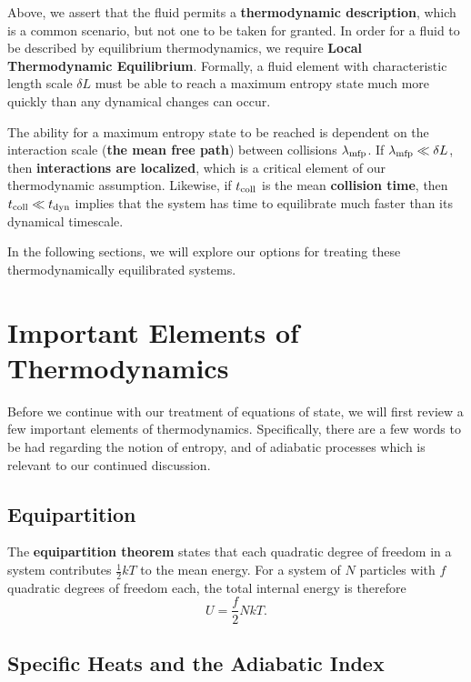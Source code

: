 \begin{remark}
    Above, we assert that the fluid permits a \textbf{thermodynamic description}, which is a common scenario, but not one to be taken for granted. In order for a fluid to be described by equilibrium thermodynamics, we require \textbf{Local Thermodynamic Equilibrium}. Formally, a fluid element with characteristic length scale $\delta L$ must be able to reach a maximum entropy state much more quickly than any dynamical changes can occur.

The ability for a maximum entropy state to be reached is dependent on the interaction scale (\textbf{the mean free path}) between collisions $\lambda_{\rm mfp}$. If $\lambda_{\rm mfp} \ll \delta L$, then \textbf{interactions are localized}, which is a critical element of our thermodynamic assumption. Likewise, if $t_{\rm coll}$ is the mean \textbf{collision time}, then $t_{\rm coll} \ll t_{\rm dyn}$ implies that the system has time to equilibrate much faster than its dynamical timescale.
\end{remark}

In the following sections, we will explore our options for treating these thermodynamically equilibrated systems.

\section{Important Elements of Thermodynamics}

Before we continue with our treatment of equations of state, we will first review a few important elements of thermodynamics. Specifically, there are a few words to be had regarding
the notion of entropy, and of adiabatic processes which is relevant to our continued discussion.

\subsection{Equipartition}

The \textbf{equipartition theorem} states that each quadratic degree of freedom in a system contributes $\tfrac{1}{2}kT$ to the mean energy. For a system of $N$ particles with $f$ quadratic degrees of freedom each, the total internal energy is therefore
\[
U = \frac{f}{2} NkT.
\]

\subsection{Specific Heats and the Adiabatic Index}

